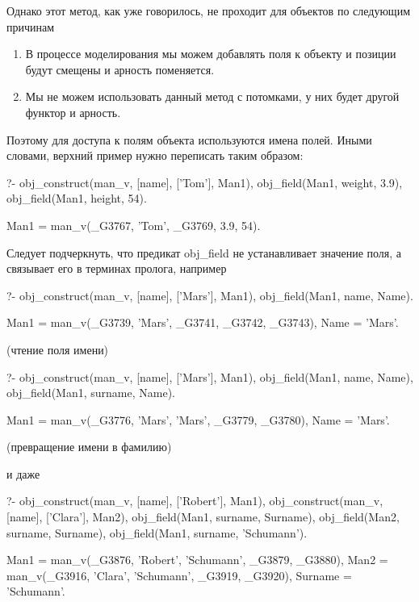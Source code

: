 \documentclass[a4paper]{book}
\begin{document}
Однако этот метод, как уже говорилось, не проходит для объектов
по следующим причинам

\begin{enumerate}
\item В процессе моделирования мы можем добавлять поля к объекту и
позиции будут смещены и арность поменяется.
\item Мы не можем использовать данный метод с потомками, у них будет
другой функтор и арность.
\end{enumerate}

Поэтому для доступа к полям объекта {\/} используются имена
полей. Иными словами, верхний пример нужно переписать таким
образом:

\begin{example}{}{}
?- obj_construct(man_v, [name], ['Tom'], Man1), 
   obj_field(Man1, weight, 3.9), 
   obj_field(Man1, height, 54).

Man1 = man_v(_G3767, 'Tom', _G3769, 3.9, 54).
\end{example}

Следует подчеркнуть, что предикат obj\_field не устанавливает
значение поля, а связывает его в терминах пролога, например

\begin{example}{}{}
?- obj_construct(man_v, [name], ['Mars'], Man1), 
   obj_field(Man1, name, Name).

Man1 = man_v(_G3739, 'Mars', _G3741, _G3742, _G3743),
Name = 'Mars'.
\end{example}
(чтение поля имени)

\begin{example}{}{}
?- obj_construct(man_v, [name], ['Mars'], Man1), 
   obj_field(Man1, name, Name), 
   obj_field(Man1, surname, Name).

Man1 = man_v(_G3776, 'Mars', 'Mars', _G3779, _G3780),
Name = 'Mars'.
\end{example}
(превращение имени в фамилию)

и даже

\begin{example}{}{}
?- obj_construct(man_v, [name], ['Robert'], Man1), 
   obj_construct(man_v, [name], ['Clara'], Man2), 
   obj_field(Man1, surname, Surname), 
   obj_field(Man2, surname, Surname), 
   obj_field(Man1, surname, 'Schumann').

Man1 = man_v(_G3876, 'Robert', 'Schumann', _G3879, _G3880),
Man2 = man_v(_G3916, 'Clara', 'Schumann', _G3919, _G3920),
Surname = 'Schumann'.
\end{example}
\end{document}
